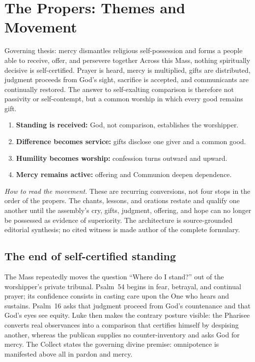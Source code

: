 \section*{The Propers: Themes and Movement}
\label{triptych:brief-synthesis:start}

\begin{massbox}{Governing thesis: mercy dismantles religious self-possession and forms a people able to receive, offer, and persevere together}
Across this Mass, nothing spiritually decisive is self-certified.  Prayer is
heard, mercy is multiplied, gifts are distributed, judgment proceeds from
God's sight, sacrifice is accepted, and communicants are continually restored.
The answer to self-exalting comparison is therefore not passivity or
self-contempt, but a common worship in which every good remains gift.
\end{massbox}

\begin{enumerate}[leftmargin=1.5em,itemsep=0.1em]
\item \textbf{Standing is received:} God, not comparison, establishes the worshipper.
\item \textbf{Difference becomes service:} gifts disclose one giver and a common good.
\item \textbf{Humility becomes worship:} confession turns outward and upward.
\item \textbf{Mercy remains active:} offering and Communion deepen dependence.
\end{enumerate}

\noindent\emph{How to read the movement.} These are recurring conversions,
not four stops in the order of the propers.  The chants, lessons, and orations
restate and qualify one another until the assembly's cry, gifts, judgment,
offering, and hope can no longer be possessed as evidence of superiority.
The architecture is source-grounded editorial synthesis; no cited witness is
made author of the complete formulary.

\subsection*{The end of self-certified standing}

The Mass repeatedly moves the question ``Where do I stand?'' out of the
worshipper's private tribunal.  Psalm~54 begins in fear, betrayal, and
continual prayer; its confidence consists in casting care upon the One who
hears and sustains.  Psalm~16 asks that judgment proceed from God's
countenance and that God's eyes see equity.  Luke then makes the contrary
posture visible: the Pharisee converts real observances into a comparison
that certifies himself by despising another, whereas the publican supplies no
counter-inventory and asks God for mercy.  The Collect states the governing
divine premise: omnipotence is manifested above all in pardon and mercy.

